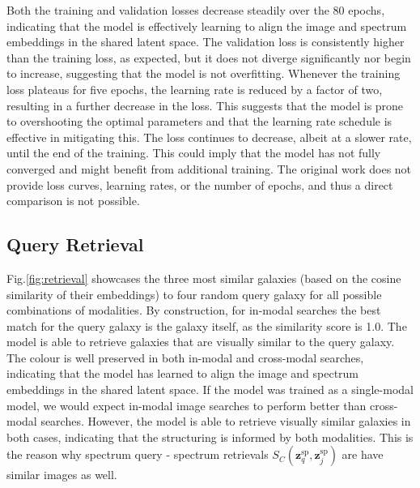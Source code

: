 \documentclass[a4paper,12pt]{article}
\begin{document}
Both the training and validation losses decrease steadily over the 80 epochs, indicating that the model is effectively learning to align the image and spectrum embeddings in the shared latent space. The validation loss is consistently higher than the training loss, as expected, but it does not diverge significantly nor begin to increase, suggesting that the model is not overfitting. Whenever the training loss plateaus for five epochs, the learning rate is reduced by a factor of two, resulting in a further decrease in the loss. This suggests that the model is prone to overshooting the optimal parameters and that the learning rate schedule is effective in mitigating this. The loss continues to decrease, albeit at a slower rate, until the end of the training. This could imply that the model has not fully converged and might benefit from additional training. The original work does not provide loss curves, learning rates, or the number of epochs, and thus a direct comparison is not possible.









\subsection{Query Retrieval}
Fig.\ref{fig:retrieval} showcases the three most similar galaxies (based on the cosine similarity of their embeddings) to four random query galaxy for all possible combinations of modalities. By construction, for in-modal searches the best match for the query galaxy is the galaxy itself, as the similarity score is 1.0. The model is able to retrieve galaxies that are visually similar to the query galaxy. The colour is well preserved in both in-modal and cross-modal searches, indicating that the model has learned to align the image and spectrum embeddings in the shared latent space. If the model was trained as a single-modal model, we would expect in-modal image searches to perform better than cross-modal searches. However, the model is able to retrieve visually similar galaxies in both cases, indicating that the structuring is informed by both modalities.  This is the reason why spectrum query - spectrum retrievals $S_C(\mathbf{z}^{\text{sp}}_q, \mathbf{z}^{\text{sp}}_j)$ are have similar images as well. 
\end{document}
